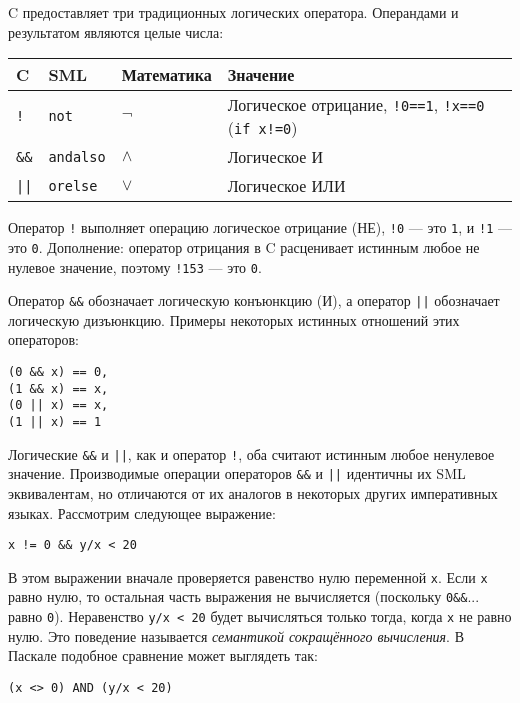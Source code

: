 C предоставляет три традиционных логических оператора. Операндами и результатом являются целые числа:

\begin{tabular}{|l|l|l|p{7cm}|}
\hline \hline
C & SML & Математика & Значение \\ \hline
\lstinline|!| & \lstinline|not| & $\neg$ & Логическое отрицание, \lstinline|!0==1|, \-\lstinline|!x==0| (\lstinline|if x!=0|) \\
\lstinline|&&| & \lstinline|andalso| & $\wedge$ & Логическое И \\
\lstinline!||! & \lstinline|orelse| & $\vee$ & Логическое ИЛИ \\
\hline \hline
\end{tabular}

Оператор \lstinline|!| выполняет операцию логическое отрицание (НЕ), \lstinline|!0| --- это \lstinline|1|, и \lstinline|!1| --- это \lstinline|0|. Дополнение: оператор отрицания в C расценивает истинным любое не нулевое значение, поэтому \lstinline|!153| --- это \lstinline|0|.

Оператор \lstinline|&&| обозначает логическую конъюнкцию (И), а оператор \lstinline!||! обозначает логическую дизъюнкцию. Примеры некоторых истинных отношений этих операторов:

\begin{lstlisting}
(0 && x) == 0,
(1 && x) == x,
(0 || x) == x,
(1 || x) == 1
\end{lstlisting}

Логические \lstinline|&&| и \lstinline!||!, как и оператор \lstinline|!|, оба считают истинным любое ненулевое значение. Производимые операции операторов \lstinline|&&| и \lstinline!||! идентичны их SML эквивалентам, но отличаются от их аналогов в некоторых других императивных языках. Рассмотрим следующее выражение:

\begin{lstlisting}
x != 0 && y/x < 20
\end{lstlisting}

В этом выражении вначале проверяется равенство нулю переменной \lstinline|x|. Если \lstinline|x| равно нулю, то остальная часть выражения не вычисляется (поскольку \lstinline|0&&|... равно \lstinline|0|). Неравенство \lstinline|y/x < 20| будет вычисляться только тогда, когда \lstinline|x| не равно нулю. Это поведение называется \emph{семантикой сокращённого вычисления}. В Паскале подобное сравнение может выглядеть так:

\begin{lstlisting}
(x <> 0) AND (y/x < 20)
\end{lstlisting}

